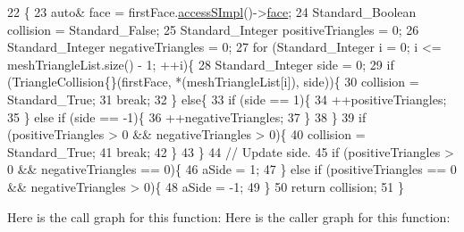 \begin{DoxyCode}
22                                 \{
23     \textcolor{keyword}{auto}& face = firstFace.\hyperlink{classMcCAD_1_1Geometry_1_1Surface_a989de1f9ebe3de043412014ed25e52eb}{accessSImpl}()->\hyperlink{classMcCAD_1_1Geometry_1_1Surface_1_1Impl_abf7c4dc859404ce42b425c7d6b578f69}{face};
24     Standard\_Boolean collision = Standard\_False;
25     Standard\_Integer positiveTriangles = 0;
26     Standard\_Integer negativeTriangles = 0;
27     \textcolor{keywordflow}{for} (Standard\_Integer i = 0; i <= meshTriangleList.size() - 1; ++i)\{
28         Standard\_Integer side = 0;
29         \textcolor{keywordflow}{if} (TriangleCollision\{\}(firstFace, *(meshTriangleList[i]), side))\{
30             collision = Standard\_True;
31             \textcolor{keywordflow}{break};
32         \} \textcolor{keywordflow}{else}\{
33             \textcolor{keywordflow}{if} (side == 1)\{
34                 ++positiveTriangles;
35             \} \textcolor{keywordflow}{else} \textcolor{keywordflow}{if} (side == -1)\{
36                 ++negativeTriangles;
37             \}
38         \}
39         \textcolor{keywordflow}{if} (positiveTriangles > 0 && negativeTriangles > 0)\{
40             collision = Standard\_True;
41             \textcolor{keywordflow}{break};
42         \}
43     \}
44     \textcolor{comment}{// Update side.}
45     \textcolor{keywordflow}{if} (positiveTriangles > 0 && negativeTriangles == 0)\{
46         aSide = 1;
47     \} \textcolor{keywordflow}{else} \textcolor{keywordflow}{if} (positiveTriangles == 0 && negativeTriangles > 0)\{
48         aSide = -1;
49     \}
50     \textcolor{keywordflow}{return} collision;
51 \}
\end{DoxyCode}
Here is the call graph for this function\+:
Here is the caller graph for this function\+:
\mbox{\label{classMcCAD_1_1Decomposition_1_1FaceCollision_ab4dffccfd15895b37362d8f4a46dff0f}} 
